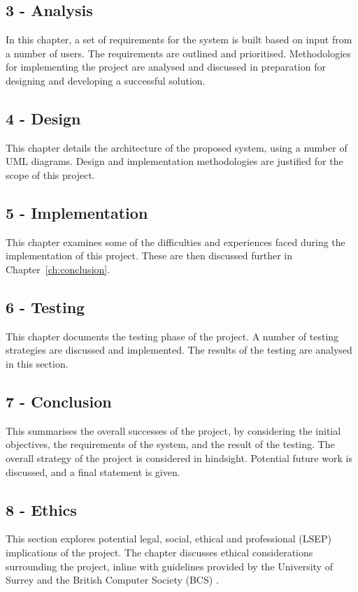 \subsection*{3 - Analysis}
In this chapter, a set of requirements for the system is built based on input from a number of users. The requirements are outlined and prioritised. Methodologies for implementing the project are analysed and discussed in preparation for designing and developing a successful solution.

\subsection*{4 - Design}
This chapter details the architecture of the proposed system, using a number of UML diagrams. Design and implementation methodologies are justified for the scope of this project.

\subsection*{5 - Implementation}
This chapter examines some of the difficulties and experiences faced during the implementation of this project. These are then discussed further in Chapter~\ref{ch:conclusion}.

\subsection*{6 - Testing}
This chapter documents the testing phase of the project. A number of testing strategies are discussed and implemented. The results of the testing are analysed in this section.

\subsection*{7 - Conclusion}
This summarises the overall successes of the project, by considering the initial objectives, the requirements of the system, and the result of the testing. The overall strategy of the project is considered in hindsight. Potential future work is discussed, and a final statement is given.

\subsection*{8 - Ethics}
This section explores potential legal, social, ethical and professional (LSEP) implications of the project. The chapter discusses ethical considerations surrounding the project, inline with guidelines provided by the University of Surrey \cite{surreyethics} and the British Computer Society (BCS) \cite{bcs2019conduct}.

